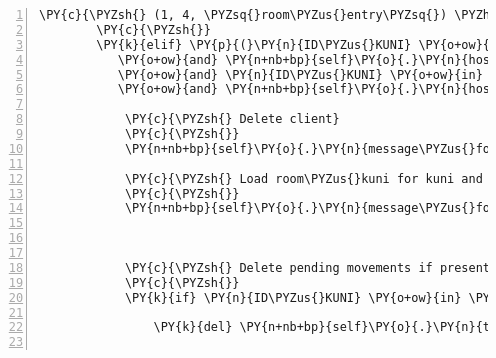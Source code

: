 \begin{Verbatim}[commandchars=\\\{\},numbers=left,firstnumber=1,stepnumber=1]
        \PY{c}{\PYZsh{} (1, 4, \PYZsq{}room\PYZus{}entry\PYZsq{}) \PYZhy{}\PYZgt{} Teleports Kuni to room\PYZus{}kuni}
        \PY{c}{\PYZsh{}}
        \PY{k}{elif} \PY{p}{(}\PY{n}{ID\PYZus{}KUNI} \PY{o+ow}{in} \PY{n+nb+bp}{self}\PY{o}{.}\PY{n}{host}\PY{o}{.}\PY{n}{room\PYZus{}by\PYZus{}client}\PY{o}{.}\PY{n}{keys}\PY{p}{(}\PY{p}{)}
           \PY{o+ow}{and} \PY{n+nb+bp}{self}\PY{o}{.}\PY{n}{host}\PY{o}{.}\PY{n}{room\PYZus{}by\PYZus{}client}\PY{p}{[}\PY{n}{ID\PYZus{}KUNI}\PY{p}{]}\PY{o}{.}\PY{n}{identifier} \PY{o}{==} \PY{l+s}{\PYZdq{}}\PY{l+s}{room\PYZus{}entry}\PY{l+s}{\PYZdq{}}
           \PY{o+ow}{and} \PY{n}{ID\PYZus{}KUNI} \PY{o+ow}{in} \PY{n+nb+bp}{self}\PY{o}{.}\PY{n}{host}\PY{o}{.}\PY{n}{room\PYZus{}by\PYZus{}client}\PY{p}{[}\PY{n}{ID\PYZus{}KUNI}\PY{p}{]}\PY{o}{.}\PY{n}{entity\PYZus{}locations}\PY{o}{.}\PY{n}{keys}\PY{p}{(}\PY{p}{)}
           \PY{o+ow}{and} \PY{n+nb+bp}{self}\PY{o}{.}\PY{n}{host}\PY{o}{.}\PY{n}{room\PYZus{}by\PYZus{}client}\PY{p}{[}\PY{n}{ID\PYZus{}KUNI}\PY{p}{]}\PY{o}{.}\PY{n}{entity\PYZus{}locations}\PY{p}{[}\PY{n}{ID\PYZus{}KUNI}\PY{p}{]} \PY{o}{==} \PY{p}{(}\PY{l+m+mi}{1}\PY{p}{,} \PY{l+m+mi}{4}\PY{p}{)}\PY{p}{)}\PY{p}{:}

            \PY{c}{\PYZsh{} Delete client}
            \PY{c}{\PYZsh{}}
            \PY{n+nb+bp}{self}\PY{o}{.}\PY{n}{message\PYZus{}for\PYZus{}host}\PY{o}{.}\PY{n}{event\PYZus{}list}\PY{o}{.}\PY{n}{append}\PY{p}{(}\PY{n}{fabula}\PY{o}{.}\PY{n}{DeleteEvent}\PY{p}{(}\PY{n}{ID\PYZus{}KUNI}\PY{p}{)}\PY{p}{)}

            \PY{c}{\PYZsh{} Load room\PYZus{}kuni for kuni and spawn kuni at position (6, 4)}
            \PY{c}{\PYZsh{}}
            \PY{n+nb+bp}{self}\PY{o}{.}\PY{n}{message\PYZus{}for\PYZus{}host}\PY{o}{.}\PY{n}{event\PYZus{}list}\PY{o}{.}\PY{n}{extend}\PY{p}{(}\PY{n+nb+bp}{self}\PY{o}{.}\PY{n}{\PYZus{}load\PYZus{}room}\PY{p}{(}\PY{n}{ID\PYZus{}KUNI}\PY{p}{,}
                                                                    \PY{l+s}{\PYZdq{}}\PY{l+s}{room\PYZus{}kuni}\PY{l+s}{\PYZdq{}}\PY{p}{,}
                                                                    \PY{p}{(}\PY{l+m+mi}{6}\PY{p}{,} \PY{l+m+mi}{4}\PY{p}{)}\PY{p}{)}\PY{p}{)}

            \PY{c}{\PYZsh{} Delete pending movements if present}
            \PY{c}{\PYZsh{}}
            \PY{k}{if} \PY{n}{ID\PYZus{}KUNI} \PY{o+ow}{in} \PY{n+nb+bp}{self}\PY{o}{.}\PY{n}{tries\PYZus{}to\PYZus{}move\PYZus{}dict}\PY{o}{.}\PY{n}{keys}\PY{p}{(}\PY{p}{)}\PY{p}{:}

                \PY{k}{del} \PY{n+nb+bp}{self}\PY{o}{.}\PY{n}{tries\PYZus{}to\PYZus{}move\PYZus{}dict}\PY{p}{[}\PY{n}{ID\PYZus{}KUNI}\PY{p}{]}


\end{Verbatim}
